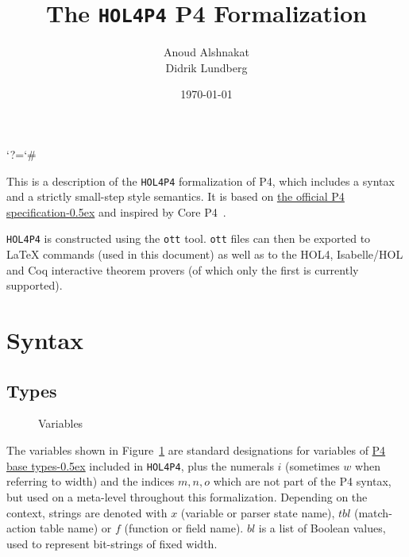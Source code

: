 \documentclass[UTF8]{article}
\title{%
The \texttt{HOL4P4} P4 Formalization}
\author{Anoud Alshnakat\\
Didrik Lundberg
}
\date{\today}
\begin{document}
\maketitle

\newcommand{\pfott}{\texttt{HOL4P4}}

\begingroup\lccode`?=`# \lowercase{\endgroup
\newcommand{\specsec}[1]{%
    ?#1%
}
}
\newcommand{\pfourspec}[2]{%
\href{https://p4.org/p4-spec/docs/P4-16-v-1.2.3.html\specsec{#1}}{#2\kern-0.5ex} %
}

\noindent
This is a description of the \pfott{} formalization of P4, which includes a syntax and a strictly small-step style semantics. It is based on \pfourspec{}{the official P4 specification} and inspired by Core P4~\cite{doenges2021petr4}.

\pfott{} is constructed using the \texttt{ott} tool. \texttt{ott} files can then be exported to \LaTeX{} commands (used in this document) as well as to the HOL4, Isabelle/HOL and Coq interactive theorem provers (of which only the first is currently supported).

\section{Syntax}
\subsection{Types}
\newcommand{\num}{\ensuremath{i}}
\newcommand{\vn}{\ensuremath{x}}
\newcommand{\msg}{\ensuremath{\mathit{msg}}}
\newcommand{\tn}{\ensuremath{\mathit{tbl}}}
\newcommand{\fn}{\ensuremath{f}}
\newcommand{\inte}{\ensuremath{bl}}
%
%
\begin{figure}[h!]
\centering
\ottmetavars
\caption{Variables}
\label{fig:vars}
\end{figure}

The variables shown in Figure~\ref{fig:vars} are standard designations for variables of \pfourspec{sec-base-types}{P4 base types} included in \pfott{}, plus the numerals \num{} (sometimes $w$ when referring to width) and the indices $m, n, o$ which are not part of the P4 syntax, but used on a meta-level throughout this formalization. Depending on the context, strings are denoted with \vn{} (variable or parser state name), \tn{} (match-action table name) or \fn{} (function or field name). \inte{} is a list of Boolean values, used to represent bit-strings of fixed width.
\end{document}
